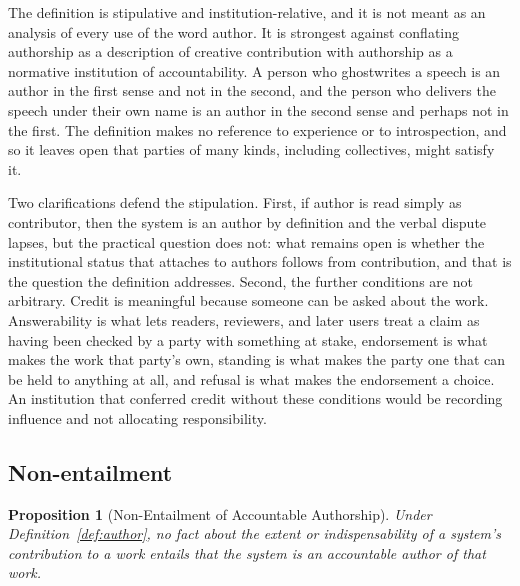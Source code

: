 \documentclass[12pt]{article}
\theoremstyle{definition}
\theoremstyle{plain}
\newtheorem{proposition}{Proposition}
\begin{document}
The definition is stipulative and institution-relative, and it is not meant as an analysis of every use of the word author. It is strongest against conflating authorship as a description of creative contribution with authorship as a normative institution of accountability. A person who ghostwrites a speech is an author in the first sense and not in the second, and the person who delivers the speech under their own name is an author in the second sense and perhaps not in the first. The definition makes no reference to experience or to introspection, and so it leaves open that parties of many kinds, including collectives, might satisfy it.

Two clarifications defend the stipulation. First, if author is read simply as contributor, then the system is an author by definition and the verbal dispute lapses, but the practical question does not: what remains open is whether the institutional status that attaches to authors follows from contribution, and that is the question the definition addresses. Second, the further conditions are not arbitrary. Credit is meaningful because someone can be asked about the work. Answerability is what lets readers, reviewers, and later users treat a claim as having been checked by a party with something at stake, endorsement is what makes the work that party's own, standing is what makes the party one that can be held to anything at all, and refusal is what makes the endorsement a choice. An institution that conferred credit without these conditions would be recording influence and not allocating responsibility.

\subsection{Non-entailment}

\begin{proposition}[Non-Entailment of Accountable Authorship]\label{prop:nonentail}
Under Definition~\ref{def:author}, no fact about the extent or indispensability of a system's contribution to a work entails that the system is an accountable author of that work.
\end{proposition}
\end{document}
